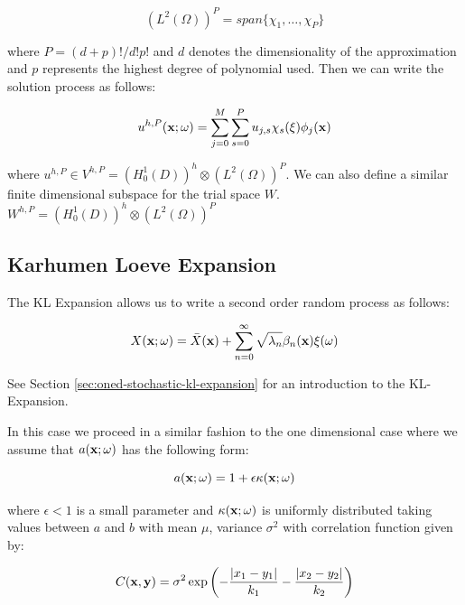 \begin{equation}
    (L^2(\Omega))^P = span\{\chi_1,\ldots,\chi_P\}
\end{equation}

where $P = (d + p)!/d!p!$ and $d$ denotes the dimensionality of the
approximation and $p$ represents the highest degree of polynomial used. Then we
can write the solution process as follows:

\begin{equation}\label{eq:twod-stochastic-uhp}
    u^{h,P}(\mathbf{x};\omega) = \sum_{j=0}^M\sum_{s=0}^Pu_{j,s}
        \chi_s(\xi)\phi_j(\mathbf{x})
\end{equation}

where $u^{h,P} \in V^{h,P} = (H^1_0(D))^h \otimes (L^2(\Omega))^P$. We can also
define a similar finite dimensional subspace for the trial space $W$.
$W^{h,P} = (H^1_0(D))^h \otimes (L^2(\Omega))^P$


\subsection{Karhumen Loeve Expansion}\label{sec:twod-stochastic-kl-expand}

The KL Expansion allows us to write a second order random process as follows:

\begin{equation}
    X(\mathbf{x};\omega) = \bar{X}(\mathbf{x}) +
        \sum_{n=0}^\infty\sqrt{\lambda_n}\beta_n(\mathbf{x})\xi(\omega)
\end{equation}

See Section \ref{sec:oned-stochastic-kl-expansion} for an introduction to the
KL-Expansion.

In this case we proceed in a similar fashion to the one dimensional case where
we assume that $a(\mathbf{x};\omega)$ has the following form:

\begin{equation}
    a(\mathbf{x};\omega) = 1 + \epsilon\kappa(\mathbf{x};\omega)
\end{equation}

where $\epsilon < 1$ is a small parameter and $\kappa(\mathbf{x};\omega)$ is
uniformly distributed taking values between $a$ and $b$ with mean $\mu$,
variance $\sigma^2$ with correlation function given by:

\begin{equation}
    C(\mathbf{x}, \mathbf{y}) =
        \sigma^2\exp{\left(-\frac{|x_1 - y_1|}{k_1} - \frac{|x_2 - y_2|}{k_2}\right)}
\end{equation}

